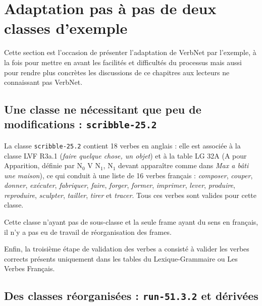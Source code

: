\section{Adaptation pas à pas de deux classes d'exemple}
\label{exempleadaptation}

Cette section est l'occasion de présenter l'adaptation de VerbNet par
l'exemple, à la fois pour mettre en avant les facilités et difficultés du
processus mais aussi pour rendre plus concrètes les discussions de ce chapitres
aux lecteurs ne connaissant pas VerbNet.

\subsection{Une classe ne nécessitant que peu de modifications :
\texttt{scribble-25.2}}
\label{exemple_scribble}

La classe {\color{blue}\texttt{scribble-25.2}} contient 18 verbes en anglais :
elle est associée à la classe LVF {\color{red}R3a.1} (\textit{faire quelque
chose, un objet}) et à la table LG {\color{green}32A} (A pour Apparition,
définie par N$_0$ V N$_1$, N$_1$ devant apparaître comme dans \textit{Max a
bâti une maison}), ce qui conduit à une liste de 16 verbes français :
\textit{composer}, \textit{couper}, \textit{donner}, \textit{exécuter},
\textit{fabriquer}, \textit{faire}, \textit{forger}, \textit{former},
\textit{imprimer}, \textit{lever}, \textit{produire}, \textit{reproduire},
\textit{sculpter}, \textit{tailler}, \textit{tirer} et \textit{tracer}. Tous
ces verbes sont valides pour cette classe.

Cette classe n'ayant pas de sous-classe et la seule frame ayant du sens en
français, il n'y a pas eu de travail de réorganisation des frames.

Enfin, la troisième étape de validation des verbes a consisté à valider les
verbes corrects présents uniquement dans les tables du Lexique-Grammaire ou Les
Verbes Français.

\subsection{Des classes réorganisées : \texttt{run-51.3.2} et dérivées}

